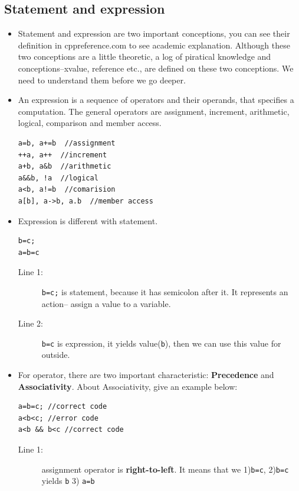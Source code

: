 \documentclass[a4paper,11pt,twoside]{book}
\begin{document}
\subsection{Statement and expression}
\begin{itemize}
	\item Statement and expression are two important conceptions, you can see their definition in cppreference.com to see academic explanation. Although these two conceptions are a little theoretic, a log of piratical knowledge and conceptions--xvalue, reference etc., are defined on these two conceptions. We need to understand them before we go deeper. 
	
	\item An expression is a sequence of operators and their operands, that specifies a computation. The general operators are assignment, increment, arithmetic, logical, comparison and member access.
\begin{lstlisting}[numbers=none]
a=b, a+=b  //assignment
++a, a++  //increment
a+b, a&b  //arithmetic
a&&b, !a  //logical
a<b, a!=b  //comarision
a[b], a->b, a.b  //member access
\end{lstlisting}
	
	\item Expression is different with statement. 
\begin{lstlisting} 
b=c;
a=b=c
\end{lstlisting}
\begin{description}
	\item[Line 1:] \texttt{b=c;} is statement, because it has semicolon after it. It represents an action-- assign a value to a variable.
	
	\item[Line 2:] \texttt{b=c} is expression, it yields value(\texttt{b}), then we can use this value for outside.
\end{description}


	\item For operator, there are two important characteristic: \textbf{Precedence} and \textbf{Associativity}. About Associativity, give an example below:
\begin{lstlisting}
a=b=c; //correct code
a<b<c; //error code
a<b && b<c //correct code
\end{lstlisting}

\begin{description}
	\item[Line 1:] assignment operator is \textbf{right-to-left}. It means that we 1)\texttt{b=c}, 2)\texttt{b=c} yields \texttt{b} 3) \texttt{a=b} 
	

\end{description}
\end{itemize}
\end{document}
